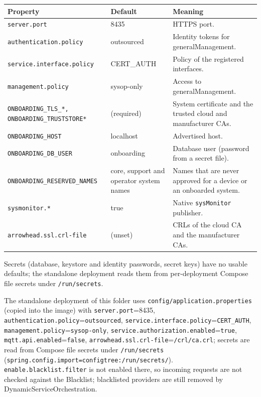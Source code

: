 \documentclass[a4paper]{arrowhead}
\begin{document}
\noindent\begin{longtable}{| p{5.4cm} | p{3.4cm} | p{6.4cm} |} \hline
\rowcolor{gray!33} Property & Default & Meaning \\ \hline \endhead
\texttt{server.\allowbreak{}port} & 8435 & HTTPS port. \\ \hline
\texttt{authentication.\allowbreak{}policy} & outsourced & Identity tokens for generalManagement. \\ \hline
\texttt{service.\allowbreak{}interface.\allowbreak{}policy} & CERT\_AUTH & Policy of the registered interfaces. \\ \hline
\texttt{management.\allowbreak{}policy} & sysop-only & Access to generalManagement. \\ \hline
\texttt{ONBOARDING\_\allowbreak{}TLS\_\allowbreak{}*,\allowbreak{} ONBOARDING\_\allowbreak{}TRUSTSTORE*} & (required) & System certificate and the trusted cloud and manufacturer CAs. \\ \hline
\texttt{ONBOARDING\_\allowbreak{}HOST} & localhost & Advertised host. \\ \hline
\texttt{ONBOARDING\_\allowbreak{}DB\_\allowbreak{}USER} & onboarding & Database user (password from a secret file). \\ \hline
\texttt{ONBOARDING\_\allowbreak{}RESERVED\_\allowbreak{}NAMES} & core, support and operator system names & Names that are never approved for a device or an onboarded system. \\ \hline
\texttt{sysmonitor.\allowbreak{}*} & true & Native \texttt{sysMonitor} publisher. \\ \hline
\texttt{arrowhead.\allowbreak{}ssl.\allowbreak{}crl-\allowbreak{}file} & (unset) & CRLs of the cloud CA and the manufacturer CAs. \\ \hline
\end{longtable}

Secrets (database, keystore and identity passwords, secret keys) have no usable defaults; the standalone deployment reads them from per-deployment Compose file secrets under \texttt{/\allowbreak{}run/\allowbreak{}secrets}.

The standalone deployment of this folder uses \texttt{config/\allowbreak{}application.\allowbreak{}properties} (copied into the image) with \texttt{server.\allowbreak{}port}=8435, \texttt{authentication.\allowbreak{}policy}=\texttt{outsourced}, \texttt{service.\allowbreak{}interface.\allowbreak{}policy}=\texttt{CERT\_AUTH}, \texttt{management.\allowbreak{}policy}=\texttt{sysop-\allowbreak{}only}, \texttt{service.\allowbreak{}authorization.\allowbreak{}enabled}=\texttt{true}, \texttt{mqtt.\allowbreak{}api.\allowbreak{}enabled}=\texttt{false}, \texttt{arrowhead.\allowbreak{}ssl.\allowbreak{}crl-\allowbreak{}file}=\texttt{/\allowbreak{}crl/\allowbreak{}ca.\allowbreak{}crl}; secrets are read from Compose file secrets under \texttt{/\allowbreak{}run/\allowbreak{}secrets} (\texttt{spring.\allowbreak{}config.\allowbreak{}import=\allowbreak{}configtree:\allowbreak{}/\allowbreak{}run/\allowbreak{}secrets/}). \texttt{enable.\allowbreak{}blacklist.\allowbreak{}filter} is not enabled there, so incoming requests are not checked against the Blacklist; blacklisted providers are still removed by Dynamic\allowbreak{}Service\allowbreak{}Orchestration.
\end{document}
